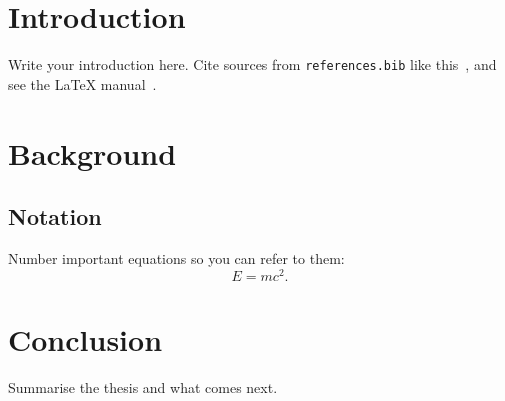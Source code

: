 \documentclass[11pt,twoside]{uwthesis}
\begin{document}
\prelimpages

\titlepage


\tableofcontents

\textpages

\chapter{Introduction}
Write your introduction here. Cite sources from \texttt{references.bib} like
this~\cite{einstein1905}, and see the \LaTeX{} manual~\cite{lamport1994}.

\chapter{Background}
\section{Notation}
Number important equations so you can refer to them:
\begin{equation}
  E = mc^2 . \label{eq:energy}
\end{equation}

\chapter{Conclusion}
Summarise the thesis and what comes next.



\end{document}
